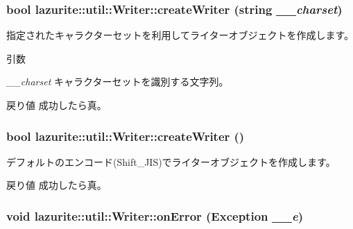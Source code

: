 \hypertarget{classlazurite_1_1util_1_1_writer_a78a3a05c40f8e22dc3f2f7bf5dc78dbf}{
\subsubsection[{createWriter}]{\setlength{\rightskip}{0pt plus 5cm}bool lazurite::util::Writer::createWriter (string {\em \_\-\_\-charset})}}
\label{classlazurite_1_1util_1_1_writer_a78a3a05c40f8e22dc3f2f7bf5dc78dbf}
指定されたキャラクターセットを利用してライターオブジェクトを作成します。 
\begin{DoxyParams}{引数}
\item[{\em \_\-\_\-charset}]キャラクターセットを識別する文字列。\end{DoxyParams}
\begin{DoxyReturn}{戻り値}
成功したら真。 
\end{DoxyReturn}
\hypertarget{classlazurite_1_1util_1_1_writer_a03a0e9029a3c2700eb539d3fb3ad1f80}{
\subsubsection[{createWriter}]{\setlength{\rightskip}{0pt plus 5cm}bool lazurite::util::Writer::createWriter ()}}
\label{classlazurite_1_1util_1_1_writer_a03a0e9029a3c2700eb539d3fb3ad1f80}
デフォルトのエンコード(Shift\_\-JIS)でライターオブジェクトを作成します。 \begin{DoxyReturn}{戻り値}
成功したら真。 
\end{DoxyReturn}
\hypertarget{classlazurite_1_1util_1_1_writer_ae0505d0da349d6009401b33e55b08bc4}{
\subsubsection[{onError}]{\setlength{\rightskip}{0pt plus 5cm}void lazurite::util::Writer::onError (Exception {\em \_\-\_\-e})}}
\label{classlazurite_1_1util_1_1_writer_ae0505d0da349d6009401b33e55b08bc4}


